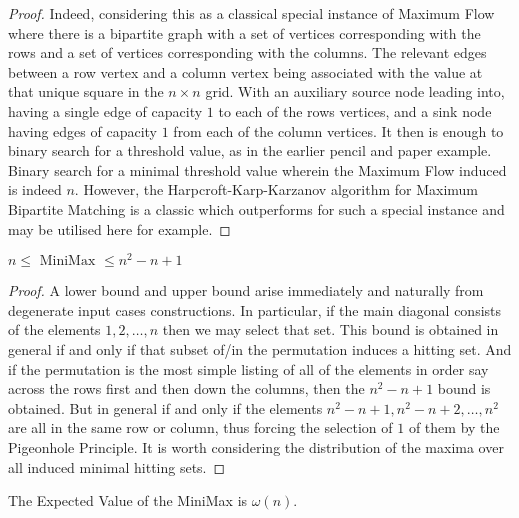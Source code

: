 \documentclass[12pt]{article}
\begin{document}
\begin{proof}
	Indeed, considering this as a classical special instance of Maximum Flow where there is a bipartite graph with a set of vertices corresponding with the rows and a set of vertices corresponding with the columns. The relevant edges between a row vertex and a column vertex being associated with the value at that unique square in the $n \times n$ grid. With an auxiliary source node leading into, having a single edge of capacity $1$ to each of the rows vertices, and a sink node having edges of capacity $1$ from each of the column vertices. It then is enough to binary search for a threshold value, as in the earlier pencil and paper example. Binary search for a minimal threshold value wherein the Maximum Flow induced is indeed $n$. However, the Harpcroft-Karp-Karzanov algorithm for Maximum Bipartite Matching is a classic which outperforms for such a special instance and may be utilised here for example.
\end{proof}

\begin{theorem}\label{Thm:$d = 2$ MiniMax Bounds}
	$n \le \text{ MiniMax } \le n^2-n+1$
\end{theorem}

\begin{proof}
	A lower bound and upper bound arise immediately and naturally from degenerate input cases constructions. In particular, if the main diagonal consists of the elements $1,2,\dots,n$ then we may select that set. This bound is obtained in general if and only if that subset of/in the permutation induces a hitting set. And if the permutation is the most simple listing of all of the elements in order say across the rows first and then down the columns, then the $n^2-n+1$ bound is obtained. But in general if and only if the elements $n^2-n+1,n^2-n+2,\dots,n^2$ are all in the same row or column, thus forcing the selection of $1$ of them by the Pigeonhole Principle. It is worth considering the distribution of the maxima over all induced minimal hitting sets.
\end{proof}

\begin{theorem}\label{Thm:$d = 2$ MiniMax Expected Value And Sum}
	The Expected Value of the MiniMax is $\omega(n)$.
\end{theorem}
\end{document}

